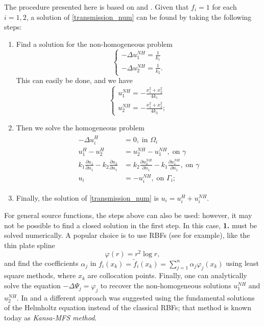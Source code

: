 The procedure presented here is based on \cite{alves2005new} and \cite{alves2021domain}. Given that \(f_i = 1\) for each \(i=1, 2\), a solution of \eqref{transmission_num} can be found by taking the following steps:
\begin{enumerate}
    \item Find a solution for the non-homogeneous problem
    \[
        \begin{cases}
            -\Delta u_1^{NH} = \frac{1}{k_1}\\
            -\Delta u_2^{NH} = \frac{1}{k_2}.
        \end{cases}
    \]
    This can easily be done, and we have
    \[
        \begin{cases}
            u_1^{NH} = -\frac{x_1^2 + x_2^2}{4k_1}\\
            u_2^{NH} = -\frac{x_1^2 + x_2^2}{4k_2};
        \end{cases}
    \]
    \item Then we solve the homogeneous problem
    \begin{align}\label{transmission_num_homo}
        \begin{split}
        - \Delta u_i^H &= 0, \; \text{in }\Omega_i\\
        u_1^H - u_2^H &= u_2^{NH}- u_1^{NH}, \; \text{on }\gamma\\
        k_1 \frac{\partial u_1}{\partial n_1} - k_2 \frac{\partial u_2}{\partial n_1} &= k_2 \frac{\partial u_2^{NH}}{\partial n_1}  - k_1 \frac{\partial u_1^{NH}}{\partial n_1}, \; \text{on }\gamma\\
        u_i &= - u_i^{NH}, \; \text{on }\Gamma_i;
        \end{split}
    \end{align}
    \item Finally, the solution of \eqref{transmission_num} is \(u_i = u_i^H + u_i^{NH}\).
\end{enumerate}
For general source functions, the steps above can also be used: however, it may not be possible to find a closed solution in the first step. In this case, \textbf{1.} must be solved numerically. A popular choice is to use \acp{RBF} (see \cite{golberg1996improved} for example), like the thin plate spline
\[
    \varphi(r) = r^2 \log r,     
\]
and find the coefficients \(\alpha_j\) in \(f_i(x_k) = \tilde{f}_i(x_k) = \sum_{j=1}^{n} \alpha_j \varphi_j(x_k)\) using least square methods, where \(x_k\) are collocation points. Finally, one can analytically solve the equation \(-\Delta \Psi_j = \varphi_j\) to recover the non-homogeneous solutions \(u_1^{NH}\) and \(u_2^{NH}\). In \cite{alves2005new} and \cite{alves2021domain} a different approach was suggested using the fundamental solutions of the Helmholtz equation instead of the classical \acp{RBF}; that method is known today as \textit{Kansa-MFS method}.

